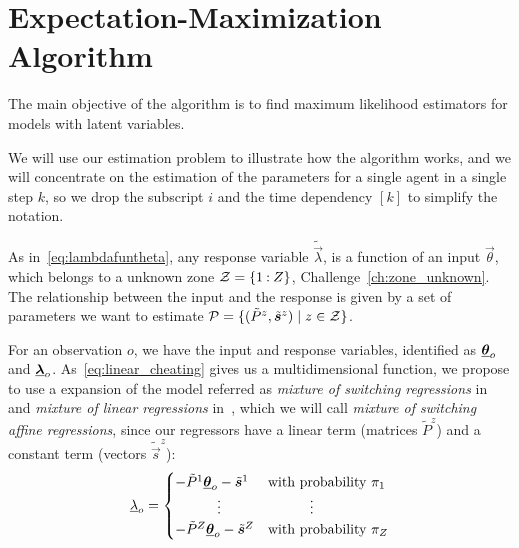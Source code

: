 \documentclass{ifacconf}  %
\begin{document}
\section{Expectation-Maximization Algorithm}\label{sec:expect-maxim-algo}

The main objective of the \EM{} algorithm is to find maximum likelihood estimators for models with latent variables.

We will use our estimation problem to illustrate how the algorithm works, and
we will concentrate on the estimation of the parameters for a single agent in a single step $k$, so we drop the subscript $i$ and the time dependency $[k]$ to simplify the notation.

As in~\eqref{eq:lambdafuntheta},  any response variable $\tilde{\vec{\lambda}}$, is a function of an input $\vec{\theta}$, which belongs to a unknown zone ${\mathcal{Z}=\{1\mathbin{:}Z\}}$, Challenge~\ref{ch:zone_unknown}.
The relationship between the input and the response is given by a set of parameters we want to estimate ${\mathcal{P}=\{(\tilde{P}^{z},\tilde{\boldsymbol{s}}^{z})\mid z\in\mathcal{Z}\}}$.

For an observation $o$, we have the input and response variables, identified as  ${\underline{\boldsymbol{\theta}}_{o}}$ and ${\underline{\boldsymbol{\lambda}}_{o}}$.
As~\eqref{eq:linear_cheating} gives us a multidimensional \pwa{} function, we propose to use a expansion of the model referred as \emph{mixture of switching regressions} in~\cite{QuandtRamsey1978} and \emph{mixture of linear regressions} in~\cite{FariaSoromenho2010}, which we will call \emph{mixture of switching affine regressions}, since our regressors have a linear term (matrices $\tilde{P}^{z}$) and a constant term (vectors $\tilde{\vec{s}}^{z}$):
  \begin{equation}
    \label{eq:linear_cheating_random}
    \underline{\lambda}_{o}=
        \begin{cases}
      -\tilde{P}^{1}{\underline{\boldsymbol{\theta}}}_{o}-\tilde{\boldsymbol{s}}^{1}&\text{with probability}\ \pi_{1} \\
      \qquad\quad \vdots&\qquad\quad \vdots\\
      -\tilde{P}^{Z}{\underline{\boldsymbol{\theta}}}_{o}-\tilde{\boldsymbol{s}}^{Z}&\text{with probability}\ \pi_{Z} \\
    \end{cases}
  \end{equation}
\end{document}
